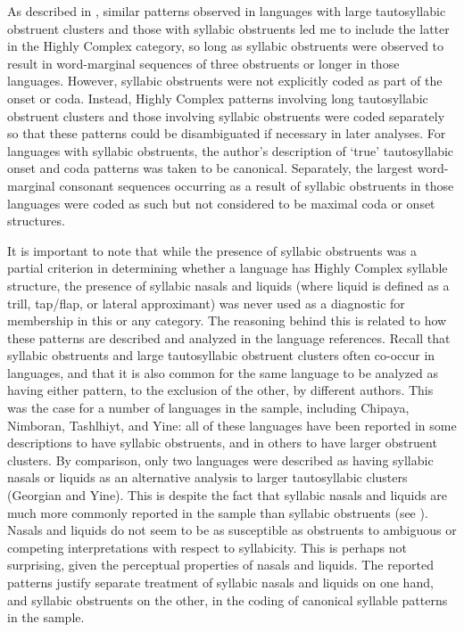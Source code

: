   As described in , similar patterns observed in languages with large tautosyllabic obstruent clusters and those with syllabic obstruents led me to include the latter in the Highly Complex category, so long as syllabic obstruents were observed to result in word-marginal sequences of three obstruents or longer in those languages. However, syllabic obstruents were not explicitly coded as part of the onset or coda. Instead, Highly Complex patterns involving long tautosyllabic obstruent clusters and those involving syllabic obstruents were coded separately so that these patterns could be disambiguated if necessary in later analyses. For languages with syllabic obstruents, the author’s description of ‘true’ tautosyllabic onset and coda patterns was taken to be canonical. Separately, the largest word-marginal consonant sequences occurring as a result of syllabic obstruents in those languages were coded as such but not considered to be maximal coda or onset structures.



  It is important to note that while the presence of syllabic obstruents was a partial criterion in determining whether a language has Highly Complex syllable structure, the presence of syllabic nasals and liquids (where liquid is defined as a trill, tap/flap, or lateral approximant) was never used as a diagnostic for membership in this or any category. The reasoning behind this is related to how these patterns are described and analyzed in the language references. Recall that syllabic obstruents and large tautosyllabic obstruent clusters often co-occur in languages, and that it is also common for the same language to be analyzed as having either pattern, to the exclusion of the other, by different authors. This was the case for a number of languages in the sample, including Chipaya, Nimboran, Tashlhiyt, and Yine: all of these languages have been reported in some descriptions to have syllabic obstruents, and in others to have larger obstruent clusters. By comparison, only two languages were described as having syllabic nasals or liquids as an alternative analysis to larger tautosyllabic clusters (Georgian and Yine). This is despite the fact that syllabic nasals and liquids are much more commonly reported in the sample than syllabic obstruents (see ). Nasals and liquids do not seem to be as susceptible as obstruents to ambiguous or competing interpretations with respect to syllabicity. This is perhaps not surprising, given the perceptual properties of nasals and liquids. The reported patterns justify separate treatment of syllabic nasals and liquids on one hand, and syllabic obstruents on the other, in the coding of canonical syllable patterns in the sample.


